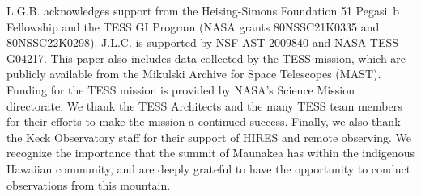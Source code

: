 \documentclass[12pt,twocolumn]{aastex63}
\begin{document}


\acknowledgements
\raggedbottom
L.G.B{.} acknowledges support from the Heising-Simons Foundation 51 Pegasi~b
Fellowship
and the TESS GI Program (NASA grants
80NSSC21K0335 and 80NSSC22K0298).
J.L.C{.} is supported by NSF AST-2009840 and NASA TESS G04217. 
%
%
This paper also includes data collected by the TESS mission, which are
publicly available from the Mikulski Archive for Space Telescopes
(MAST).
%
Funding for the TESS mission is provided by NASA's Science Mission
directorate.
%
We thank the TESS Architects
and the many TESS team members for their
efforts to make the mission a continued success.
%
%
%
%
Finally, we also thank the Keck Observatory staff for their support of
HIRES and remote observing.  We recognize the importance that the
summit of Maunakea has within the indigenous Hawaiian community, and
are deeply grateful to have the opportunity to conduct observations
from this mountain.
%
%


%
\end{document}
